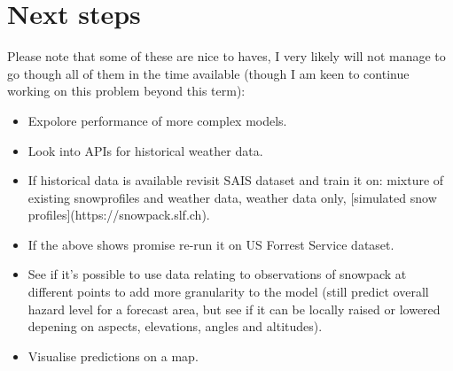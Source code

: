 \documentclass{article}
\begin{document}
\section{Next steps}
	Please note that some of these are nice to haves, I very likely will not manage to go though all of them in the time available (though I am keen to continue working on this problem beyond this term):
	\begin{itemize}
		\item Expolore performance of more complex models. 
		\item Look into APIs for historical weather data.
		\item If historical data is available revisit SAIS dataset and train it on: mixture of existing snowprofiles and weather data, weather data only, [simulated snow profiles](https://snowpack.slf.ch).
		\item If the above shows promise re-run it on US Forrest Service dataset.
		\item See if it's possible to use data relating to observations of snowpack at different points to add more granularity to the model (still predict overall hazard level for a forecast area, but see if it can be locally raised or lowered depening on aspects, elevations, angles and altitudes).
		\item Visualise predictions on a map.
	\end{itemize}
\end{document}
